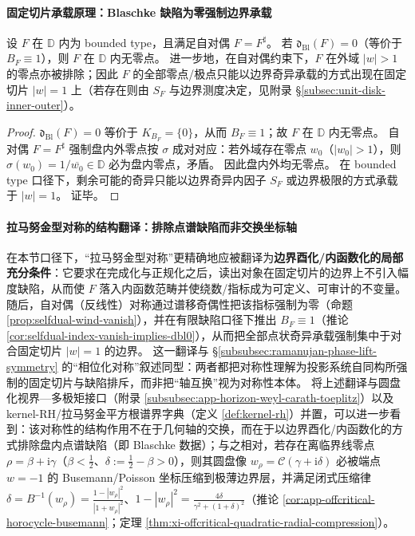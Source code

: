 \paragraph{固定切片承载原理：Blaschke 缺陷为零强制边界承载}
\begin{theorem}\label{thm:blaschke-defect-zero-fixed-slice-support}
设 \(F\) 在 \(\mathbb{D}\) 内为 bounded type，且满足自对偶 \(F=F^\sharp\)。
若 \(\mathfrak{d}_{\mathrm{Bl}}(F)=0\)（等价于 \(B_F\equiv 1\)），则 \(F\) 在 \(\mathbb{D}\) 内无零点。
进一步地，在自对偶约束下，\(F\) 在外域 \(|w|>1\) 的零点亦被排除；因此 \(F\) 的全部零点/极点只能以边界奇异承载的方式出现在固定切片 \(|w|=1\) 上（若存在则由 \(S_F\) 与边界测度决定，见附录 \S\ref{subsec:unit-disk-inner-outer}）。
\end{theorem}

\begin{proof}
\(\mathfrak{d}_{\mathrm{Bl}}(F)=0\) 等价于 \(K_{B_F}=\{0\}\)，从而 \(B_F\equiv 1\)；故 \(F\) 在 \(\mathbb{D}\) 内无零点。
自对偶 \(F=F^\sharp\) 强制盘内外零点按 \(\sigma\) 成对对应：若外域存在零点 \(w_0\)（\(|w_0|>1\)），则 \(\sigma(w_0)=1/\overline{w_0}\in\mathbb{D}\) 必为盘内零点，矛盾。
因此盘内外均无零点。
在 bounded type 口径下，剩余可能的奇异只能以边界奇异内因子 \(S_F\) 或边界极限的方式承载于 \(|w|=1\)。
证毕。
\end{proof}

\paragraph{拉马努金型对称的结构翻译：排除点谱缺陷而非交换坐标轴}
在本节口径下，“拉马努金型对称”更精确地应被翻译为\textbf{边界酉化/内函数化的局部充分条件}：它要求在完成化与正规化之后，读出对象在固定切片的边界上不引入幅度缺陷，从而使 \(F\) 落入内函数范畴并使绕数/指标成为可定义、可审计的不变量。随后，自对偶（反线性）对称通过谱移奇偶性把该指标强制为零（命题 \ref{prop:selfdual-wind-vanish}），并在有限缺陷口径下推出 \(B_F\equiv 1\)（推论 \ref{cor:selfdual-index-vanish-implies-dbl0}），从而把全部点状奇异承载强制集中于对合固定切片 \(|w|=1\) 的边界。
这一翻译与 \S\ref{subsubsec:ramanujan-phase-lift-symmetry} 的“相位化对称”叙述同型：两者都把对称性理解为投影系统自同构所强制的固定切片与缺陷排斥，而非把“轴互换”视为对称性本体。
将上述翻译与圆盘化视界—多极矩接口（附录 \ref{subsubsec:app-horizon-weyl-carath-toeplitz}）以及 kernel-RH/拉马努金平方根谱界字典（定义 \ref{def:kernel-rh}）并置，可以进一步看到：该对称性的结构作用不在于几何轴的交换，而在于以边界酉化/内函数化的方式排除盘内点谱缺陷（即 Blaschke 数据）；与之相对，若存在离临界线零点 \(\rho=\beta+\mathrm{i}\gamma\)（\(\beta<\tfrac12\)、\(\delta:=\tfrac12-\beta>0\)），则其圆盘像 \(w_\rho=\mathcal{C}(\gamma+\mathrm{i}\delta)\) 必被端点 \(w=-1\) 的 Busemann/Poisson 坐标压缩到极薄边界层，并满足闭式压缩律 \(\delta=B^{-1}(w_\rho)=\frac{1-|w_\rho|^2}{|1+w_\rho|^2}\)、\(1-|w_\rho|^2=\frac{4\delta}{\gamma^2+(1+\delta)^2}\)（推论 \ref{cor:app-offcritical-horocycle-busemann}；定理 \ref{thm:xi-offcritical-quadratic-radial-compression}）。

